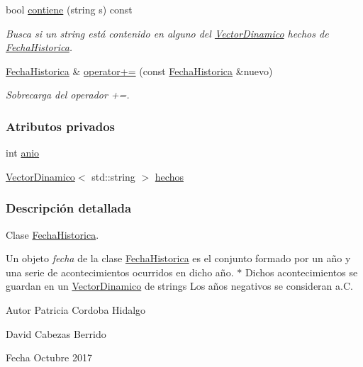 \begin{DoxyCompactItemize}
bool \hyperlink{classFechaHistorica_a640b4e6aab53202cb5127267927b44a0}{contiene} (string s) const
\begin{DoxyCompactList}\small\item\em Busca si un string está contenido en alguno del {\ttfamily \hyperlink{classVectorDinamico}{Vector\+Dinamico}} hechos de {\ttfamily \hyperlink{classFechaHistorica}{Fecha\+Historica}}. \end{DoxyCompactList}\item 
\hyperlink{classFechaHistorica}{Fecha\+Historica} \& \hyperlink{classFechaHistorica_a880169538d2701f3ce908aebd023c9bf}{operator+=} (const \hyperlink{classFechaHistorica}{Fecha\+Historica} \&nuevo)
\begin{DoxyCompactList}\small\item\em Sobrecarga del operador +=. \end{DoxyCompactList}\end{DoxyCompactItemize}
\subsubsection*{Atributos privados}
\begin{DoxyCompactItemize}
\item 
int \hyperlink{classFechaHistorica_ade873215978862ec3ca4fcaa1fd33a07}{anio}
\item 
\hyperlink{classVectorDinamico}{Vector\+Dinamico}$<$ std\+::string $>$ \hyperlink{classFechaHistorica_a6b18e8a24361f418d233a7d921975a6c}{hechos}
\end{DoxyCompactItemize}


\subsubsection{Descripción detallada}
Clase \hyperlink{classFechaHistorica}{Fecha\+Historica}. 

Un objeto {\itshape fecha} de la clase {\ttfamily \hyperlink{classFechaHistorica}{Fecha\+Historica}} es el conjunto formado por un año y una serie de acontecimientos ocurridos en dicho año. $\ast$ Dichos acontecimientos se guardan en un {\ttfamily \hyperlink{classVectorDinamico}{Vector\+Dinamico}} de strings Los años negativos se consideran a.\+C.

\begin{DoxyAuthor}{Autor}
Patricia Cordoba Hidalgo 

David Cabezas Berrido 
\end{DoxyAuthor}
\begin{DoxyDate}{Fecha}
Octubre 2017 
\end{DoxyDate}


